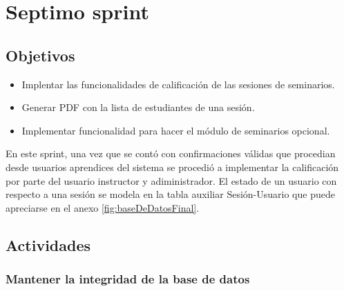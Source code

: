 \section{Septimo sprint} %
\label{sec:septimo_sprint}

\subsection{Objetivos}

\begin{itemize}
	\item Implentar las funcionalidades de calificación de las sesiones de seminarios.
	\item Generar PDF con la lista de estudiantes de una sesión.
	\item Implementar funcionalidad para hacer el módulo de seminarios opcional.
\end{itemize}

En este sprint, una vez que se contó con confirmaciones válidas que procedian desde usuarios aprendices del sistema se procedió a implementar la calificación por parte del usuario instructor y adiministrador. El estado de un usuario con respecto a una sesión se modela en la tabla auxiliar Sesión-Usuario que puede apreciarse en el anexo \ref{fig:baseDeDatosFinal}.

\subsection{Actividades} %
\label{sub:actividades6}

\subsubsection{Mantener la integridad de la base de datos}


